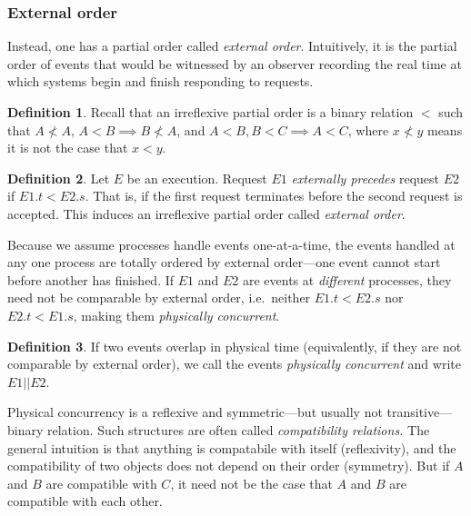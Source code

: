 \documentclass[]             %
{NASA}                       %
\theoremstyle{definition}
\newtheorem{definition}{Definition}[section]
\begin{document}
\afterpage{\clearpage}

\subsubsection{External order}
\label{causal-precedencehappens-beforeexternal-order}
Instead, one has a partial order called \emph{external order}.
Intuitively, it is the partial order of events that would be witnessed
by an observer recording the real time at which systems begin and
finish responding to requests.

\begin{definition}
  Recall that an irreflexive partial order is a binary relation \(<\)
  such that \(A \not < A\), \(A < B \implies B \not < A\), and \(A <
  B, B < C \implies A < C\), where $x \not < y$ means it is not the
  case that $x < y$.
\end{definition}


\begin{definition}
  Let $E$ be an execution. Request $E1$ \emph{externally precedes}
  request $E2$ if $E1.t < E2.s$. That is, if the first request
  terminates before the second request is accepted. This induces an
  irreflexive partial order called \emph{external order}.
\end{definition}

Because we assume processes handle events one-at-a-time, the events
handled at any one process are totally ordered by external order---one
event cannot start before another has finished. If \(E1\) and \(E2\) are
events at \emph{different} processes, they need not be comparable by
external order, i.e.~neither \(E1.t < E2.s\) nor \(E2.t < E1.s\), making
them \emph{physically concurrent}.

\begin{definition}
  If two events overlap in physical time (equivalently, if they are
  not comparable by external order), we call the events
  \emph{physically concurrent} and write $E1 || E2$.
\end{definition}

Physical concurrency is a reflexive and symmetric---but usually not
transitive--- binary relation. Such structures are often called
\emph{compatibility relations.} The general intuition is that anything
is compatabile with itself (reflexivity), and the compatibility of two
objects does not depend on their order (symmetry). But if \(A\) and
\(B\) are compatible with \(C\), it need not be the case that \(A\)
and \(B\) are compatible with each other.
\end{document}
